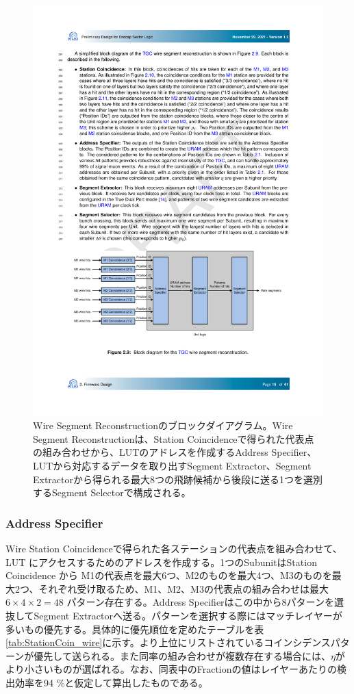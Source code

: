 \begin{figure} 
\centering
\includegraphics[width=16cm]{fig/SL/SegReco_wire.pdf}
\caption[Wire Segment Reconstructionのブロックダイアグラム]{Wire Segment Reconstructionのブロックダイアグラム\cite{SLPDR}。Wire Segment Reconstructionは、Station Coincidenceで得られた代表点の組み合わせから、LUTのアドレスを作成するAddress Specifier、LUTから対応するデータを取り出すSegment Extractor、Segment Extractorから得られる最大8つの飛跡候補から後段に送る1つを選別するSegment Selectorで構成される。}
\label{SegReco_wire}
\end{figure}

\subsubsection*{Address Specifier}
Wire Station Coincidenceで得られた各ステーションの代表点を組み合わせて、LUT にアクセスするためのアドレスを作成する。1つのSubunitはStation Coincidence から M1の代表点を最大6つ、M2のものを最大4つ、M3のものを最大2つ、それぞれ受け取るため、M1、M2、M3の代表点の組み合わせは最大$6 \times 4 \times 2 = 48$ パターン存在する。Address Specifierはこの中から8パターンを選抜してSegment Extractorへ送る。パターンを選択する際にはマッチレイヤーが多いもの優先する。具体的に優先順位を定めたテーブルを表\ref{tab:StationCoin_wire}に示す。より上位にリストされているコインシデンスパターンが優先して送られる。また同率の組み合わせが複数存在する場合には、$\eta$がより小さいものが選ばれる。なお、同表中のFractionの値はレイヤーあたりの検出効率を94 \%と仮定して算出したものである。

